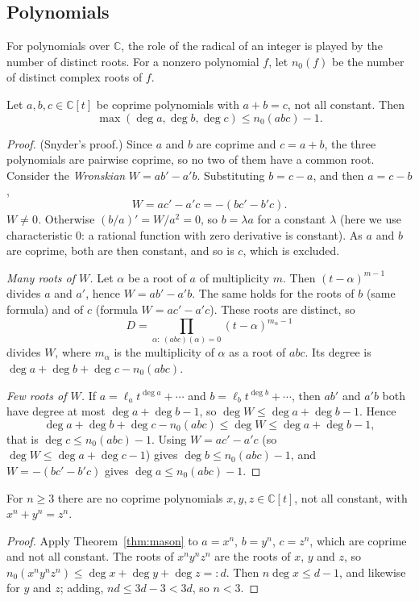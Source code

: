 \subsection*{Polynomials}

For polynomials over $\mathbb C$, the role of the radical of an integer is played by the number of distinct roots. For a
nonzero polynomial $f$, let $n_0(f)$ be the number of distinct complex roots of $f$.

\begin{theorem}\label{thm:mason}
Let $a,b,c\in\mathbb C[t]$ be coprime polynomials with $a+b=c$, not all constant. Then
\[
\max(\deg a,\deg b,\deg c)\le n_0(abc)-1.
\]
\end{theorem}
\begin{proof}
(Snyder's proof.) Since $a$ and $b$ are coprime and $c=a+b$, the three polynomials are pairwise coprime, so no two of them
have a common root. Consider the \emph{Wronskian} $W=ab'-a'b$. Substituting $b=c-a$, and then $a=c-b$,
\[
W=ac'-a'c=-(bc'-b'c).
\]
\emph{$W\ne0$.} Otherwise $(b/a)'=W/a^2=0$, so $b=\lambda a$ for a constant $\lambda$ (here we use characteristic $0$: a rational
function with zero derivative is constant). As $a$ and $b$ are coprime, both are then constant, and so is $c$, which is excluded.

\emph{Many roots of $W$.} Let $\alpha$ be a root of $a$ of multiplicity $m$. Then $(t-\alpha)^{m-1}$ divides $a$ and $a'$, hence
$W=ab'-a'b$. The same holds for the roots of $b$ (same formula) and of $c$ (formula $W=ac'-a'c$). These roots are distinct, so
\[
D=\prod_{\alpha:\ (abc)(\alpha)=0}(t-\alpha)^{m_\alpha-1}
\]
divides $W$, where $m_\alpha$ is the multiplicity of $\alpha$ as a root of $abc$. Its degree is $\deg a+\deg b+\deg c-n_0(abc)$.

\emph{Few roots of $W$.} If $a=\ell_at^{\deg a}+\cdots$ and $b=\ell_bt^{\deg b}+\cdots$, then $ab'$ and $a'b$ both have degree at
most $\deg a+\deg b-1$, so $\deg W\le\deg a+\deg b-1$. Hence
\[
\deg a+\deg b+\deg c-n_0(abc)\le\deg W\le\deg a+\deg b-1,
\]
that is $\deg c\le n_0(abc)-1$. Using $W=ac'-a'c$ (so $\deg W\le\deg a+\deg c-1$) gives $\deg b\le n_0(abc)-1$, and
$W=-(bc'-b'c)$ gives $\deg a\le n_0(abc)-1$.
\end{proof}

\begin{corollary}\label{cor:fermatpoly}
For $n\ge3$ there are no coprime polynomials $x,y,z\in\mathbb C[t]$, not all constant, with $x^n+y^n=z^n$.
\end{corollary}
\begin{proof}
Apply Theorem~\ref{thm:mason} to $a=x^n$, $b=y^n$, $c=z^n$, which are coprime and not all constant. The roots of $x^ny^nz^n$ are
the roots of $x$, $y$ and $z$, so $n_0(x^ny^nz^n)\le\deg x+\deg y+\deg z=:d$. Then $n\deg x\le d-1$, and likewise for $y$ and
$z$; adding, $nd\le3d-3<3d$, so $n<3$.
\end{proof}

